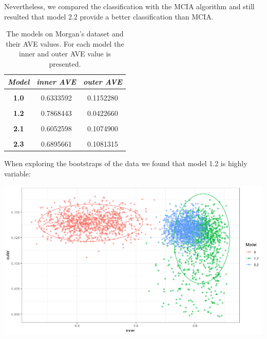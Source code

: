 \documentclass[
  12pt,
  a4paper,
  twoside,
  openright]{book}
\let\origfigure\figure
\let\endorigfigure\endfigure
\renewenvironment{figure}[1][2] {
    \expandafter\origfigure\expandafter[!ht]
} {
    \endorigfigure
}
\begin{document}
Nevertheless, we compared the classification with the MCIA algorithm and still resulted that model 2.2 provide a better classification than MCIA.

\begin{table}[H]

\caption[The models on Morgan's dataset and their AVE values.]{\label{tab:morgan-models-ave}The models on Morgan's dataset and their AVE values. For each model the inner and outer AVE value is presented.}
\centering
\begin{tabular}[t]{|>{}c|c|>{}c|}
\hline
\em{\textbf{Model}} & \em{\textbf{inner AVE}} & \em{\textbf{outer AVE}}\\
\hline
\textbf{\cellcolor{gray!6}{0.0}} & \cellcolor{gray!6}{0.4735601} & \cellcolor{gray!6}{0.1098639}\\
\hline
\textbf{1.0} & 0.6333592 & 0.1152280\\
\hline
\textbf{\cellcolor{gray!6}{1.1}} & \cellcolor{gray!6}{0.2448234} & \cellcolor{gray!6}{0.1104746}\\
\hline
\textbf{1.2} & 0.7868443 & 0.0422660\\
\hline
\textbf{\cellcolor{gray!6}{2.0}} & \cellcolor{gray!6}{0.4404123} & \cellcolor{gray!6}{0.1088730}\\
\hline
\textbf{2.1} & 0.6052598 & 0.1074900\\
\hline
\textbf{\cellcolor{gray!6}{2.2}} & \cellcolor{gray!6}{0.6895661} & \cellcolor{gray!6}{0.1081315}\\
\hline
\textbf{2.3} & 0.6895661 & 0.1081315\\
\hline
\end{tabular}
\end{table}

When exploring the bootstraps of the data we found that model 1.2 is highly variable:

\begin{figure}
\includegraphics[width=1\linewidth]{images/morgan_bootstrap} \caption[AVE scores of bootstrapped models on Morgans' dataset.]{Inner and outer AVE scores of the bootstrapped models 0 1.2 and 2.2. Model 0 does not have sample data. Model 1.2 has microbiome, transcriptonme and sample data in a single block and model 2.2 has microbiome, transcriptome and the sample data split in several blocks.}\label{fig:morgan-bootstrap}
\end{figure}
\end{document}
